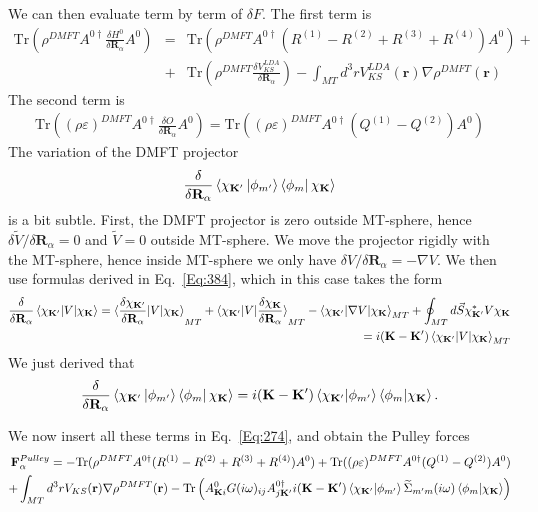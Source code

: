 \documentclass[aps,prb,floatfix,epsfig,singlecolumn,showpacs,preprintnumbers]{revtex4}
\newcommand{\vR}{{\mathbf{R}}}
\newcommand{\vF}{{\mathbf{F}}}
\renewcommand{\vr}{{\mathbf{r}}}
\newcommand{\vK}{{\mathbf{K}}}
\newcommand{\Tr}{\mathrm{Tr}}
\newcommand{\cB}{{\cal B}}
\begin{document}
We can then evaluate term by term of $\delta F$. The first term is
\begin{eqnarray}
\Tr\left( \rho^{DMFT} A^{0\dagger}\frac{\delta  H^0}{\delta\vR_\alpha}A^0 \right)&=&
\Tr( \rho^{DMFT} A^{0\dagger}(R^{(1)}-R^{(2)}+R^{(3)}+R^{(4)}) A^0)
+\\
&+&\Tr(\rho^{DMFT} \frac{\delta V_{KS}^{LDA}}{\delta\vR_\alpha} )-\int_{MT} d^3r V^{LDA}_{KS}(\vr)\nabla\rho^{DMFT}(\vr)
\nonumber 
\end{eqnarray}
The second term is
\begin{eqnarray}
\Tr\left( (\rho\varepsilon)^{DMFT} A^{0\dagger}\frac{\delta O}{\delta\vR_\alpha}A^0 \right)=
\Tr( (\rho\varepsilon)^{DMFT} A^{0\dagger}(Q^{(1)}-Q^{(2)})A^0)
\end{eqnarray}
The variation of the DMFT projector 
$$\frac{\delta}{\delta\vR_\alpha} \braket{\chi_{\vK'}\ket{\phi_{m'}}\bra{\phi_{m}}\chi_{\vK}}$$
is a bit subtle. First, the DMFT
projector is zero outside MT-sphere, hence 
$\delta\tilde{V}/\delta\vR_\alpha=0$ and $\tilde{V}=0$ outside
MT-sphere.  We move the
projector rigidly with the MT-sphere, hence inside MT-sphere we only have 
$\delta V/\delta\vR_\alpha=-\nabla V$. We then use formulas derived in
Eq.~\ref{Eq:384}, which in this case takes the form
\begin{eqnarray}
\frac{\delta}{\delta \vR_\alpha} \braket{\chi_{\vK'}|V|\chi_{\vK}} = 
\braket{\frac{\delta \chi_{\vK'}}{\delta \vR_\alpha} |V|\chi_{\vK}}_{MT}
+\braket{\chi_{\vK'}|V|\frac{\delta \chi_{\vK}}{\delta \vR_\alpha}}_{MT}
-\braket{\chi_{\vK'}|\nabla V|\chi_{\vK}}_{MT}
+\oint_{MT} d\vec{S}\chi^*_{\vK'} V \chi_{\vK} \\
=i(\vK-\vK') \braket{\chi_{\vK'}|V|\chi_{\vK}}_{MT}
\end{eqnarray}
We just derived that
\begin{eqnarray}
\frac{\delta}{\delta\vR_\alpha} \braket{\chi_{\vK'} \ket{\phi_{m'}}\bra{\phi_{m}}\chi_{\vK}}=
i(\vK-\vK')\braket{\chi_{\vK'}|\phi_{m'}}\braket{\phi_m|\chi_{\vK}}.
\end{eqnarray}

We now insert all these terms in Eq.~\ref{Eq:274}, and obtain the Pulley forces
\begin{eqnarray}
\vF^{Pulley}_{\alpha} = 
-\Tr(\rho^{DMFT} A^{0 \dagger}(R^{(1)}-R^{(2)}+R^{(3)}+R^{(4)}) A^0)
+\Tr((\rho\varepsilon)^{DMFT}A^{0 \dagger}(Q^{(1)}-Q^{(2)})A^0 ) \\
+\int_{MT} d^3r V_{KS}(\vr)\nabla\rho^{DMFT}(\vr)
-\Tr\left(
A^0_{\vK i} 
G(i\omega)_{ij}
A^{0\dagger}_{j\vK'}
i(\vK-\vK')\braket{\chi_{\vK'}|\phi_{m'}}\widetilde{\Sigma}_{m'm}(i\omega)\braket{\phi_m|\chi_{\vK}}
\right)
\end{eqnarray}
\end{document}
